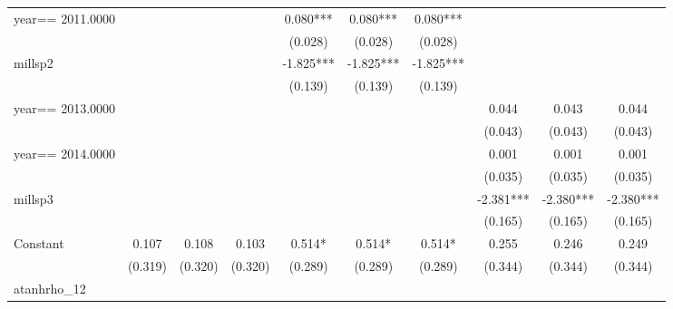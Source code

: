 \begin{table}[htbp]
\begin{tabular}{l*{9}{c}}
year==  2011.0000   &               &               &               &       0.080***&       0.080***&       0.080***&               &               &               \\
                    &               &               &               &     (0.028)   &     (0.028)   &     (0.028)   &               &               &               \\
millsp2             &               &               &               &      -1.825***&      -1.825***&      -1.825***&               &               &               \\
                    &               &               &               &     (0.139)   &     (0.139)   &     (0.139)   &               &               &               \\
year==  2013.0000   &               &               &               &               &               &               &       0.044   &       0.043   &       0.044   \\
                    &               &               &               &               &               &               &     (0.043)   &     (0.043)   &     (0.043)   \\
year==  2014.0000   &               &               &               &               &               &               &       0.001   &       0.001   &       0.001   \\
                    &               &               &               &               &               &               &     (0.035)   &     (0.035)   &     (0.035)   \\
millsp3             &               &               &               &               &               &               &      -2.381***&      -2.380***&      -2.380***\\
                    &               &               &               &               &               &               &     (0.165)   &     (0.165)   &     (0.165)   \\
Constant            &       0.107   &       0.108   &       0.103   &       0.514*  &       0.514*  &       0.514*  &       0.255   &       0.246   &       0.249   \\
                    &     (0.319)   &     (0.320)   &     (0.320)   &     (0.289)   &     (0.289)   &     (0.289)   &     (0.344)   &     (0.344)   &     (0.344)   \\
\hline
atanhrho\_12         &               &               &               &               &               &               &               &               &               \\

\end{tabular}
\end{table}
